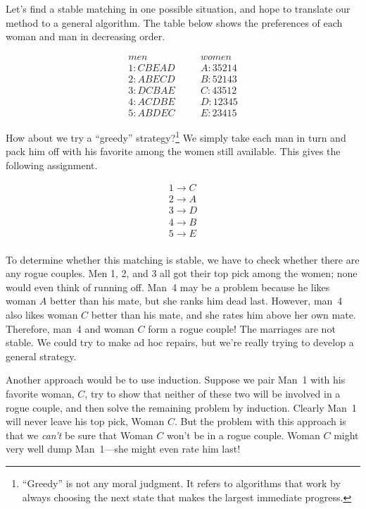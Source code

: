 Let's find a stable matching in one possible situation, and hope to
translate our method to a general algorithm.  The table below shows the
preferences of each woman and man in decreasing order.

\begin{eqnarray*}
men & \quad & women \\
1 : C B E A D & \quad & A : 3 5 2 1 4 \\
2 : A B E C D & \quad & B : 5 2 1 4 3 \\
3 : D C B A E & \quad & C : 4 3 5 1 2 \\
4 : A C D B E & \quad & D : 1 2 3 4 5 \\
5 : A B D E C & \quad & E : 2 3 4 1 5
\end{eqnarray*}

How about we try a ``greedy'' strategy?\footnote{``Greedy'' is not any
moral judgment.  It refers to algorithms that work by always choosing the
next state that makes the largest immediate progress.}  We simply take
each man in turn and pack him off with his favorite among the women still
available.  This gives the following assignment.

\begin{eqnarray*}
1 \rightarrow C \\
2 \rightarrow A \\
3 \rightarrow D \\
4 \rightarrow B \\
5 \rightarrow E \\
\end{eqnarray*}

To determine whether this matching is stable, we have to check whether
there are any rogue couples.  Men 1, 2, and 3 all got their top pick
among the women; none would even think of running off.  Man~4 may be a
problem because he likes woman $A$ better than his mate, but she ranks him
dead last.  However, man~4 also likes woman $C$ better than his mate, and
she rates him above her own mate.  Therefore, man~4 and woman $C$ form a
rogue couple!  The marriages are not stable.  We could try to make ad hoc
repairs, but we're really trying to develop a general strategy.

Another approach would be to use induction.  Suppose we pair Man~1
with his favorite woman, $C$, try to show that neither of these two
will be involved in a rogue couple, and then solve the remaining
problem by induction.  Clearly Man~1 will never leave his top pick,
Woman $C$.  But the problem with this approach is that we \emph{can't}
be sure that Woman $C$ won't be in a rogue couple.  Woman $C$ might very
well dump Man~1---she might even rate him last!

